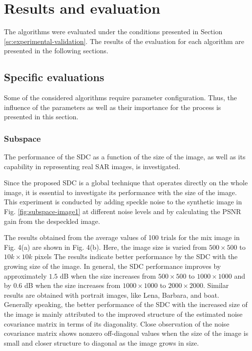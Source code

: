 \section{Results and evaluation} \label{sc:results}
The algorithms were evaluated under the conditions presented in Section \ref{sc:experimental-validation}. The results of the evaluation for each algorithm are presented in the following sections.

\subsection{Specific evaluations}
Some of the considered algorithms require parameter configuration. Thus, the influence of the parameters as well as their importance for the process is presented in this section.

\subsubsection{Subspace}
The performance of the SDC as a function of the size of the image, as well as its capability in representing real SAR images, is investigated.

Since the proposed SDC is a global technique that operates directly on the whole image, it is essential to investigate its performance with the size of the image. This experiment is conducted by adding speckle noise to the synthetic image in Fig. \ref{fig:subspace-image1} at different noise levels and by calculating the PSNR gain from the despeckled image. 

The results obtained from the average values of 100 trials for the mix image in Fig. 4(a) are shown in Fig. 4(b). Here, the image size is varied from $500\times 500$ to $10 k\times 10 k$ pixels The results indicate better performance by the SDC with the growing size of the image. In general, the SDC performance improves by approximately $1.5$ dB when the size increases from $500\times 500$ to $1000\times 1000 $ and by $0.6$ dB when the size increases from $1000\times 1000 $ to $2000\times 2000 $. Similar results are obtained with portrait images, like Lena, Barbara, and boat. Generally speaking, the better performance of the SDC with the increased size of the image is mainly attributed to the improved structure of the estimated noise covariance matrix in terms of its diagonality. Close observation of the noise covariance matrix shows nonzero off-diagonal values when the size of the image is small and closer structure to diagonal as the image grows in size.

